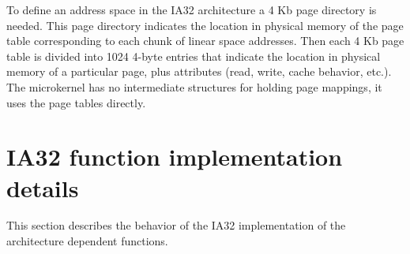 \documentclass[11pt, letterpaper, twoside, english]{book}
\begin{document}
To define an address space in the IA32 architecture a 4 Kb page directory is needed. This page directory indicates the location in physical memory of the page table corresponding to each chunk of linear space addresses. Then each 4 Kb page table is divided into 1024 4-byte entries that indicate the location in physical memory of a particular page, plus attributes (read, write, cache behavior, etc.). The microkernel has no intermediate structures for holding page mappings, it uses the page tables directly.

\section{IA32 function implementation details}

This section describes the behavior of the IA32 implementation of the architecture dependent functions.
\end{document}
